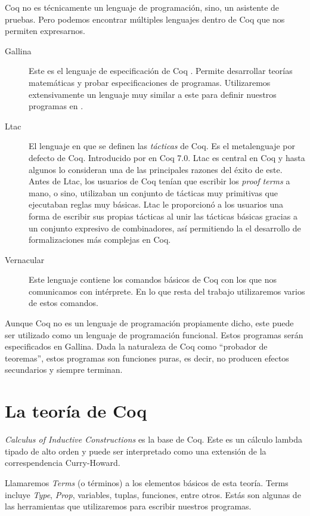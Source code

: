Coq no es técnicamente un lenguaje de programación, sino, un asistente de pruebas. Pero podemos encontrar múltiples lenguajes dentro de Coq que nos permiten expresarnos. 
\begin{description}
    \item[Gallina] Este es el lenguaje de especificación de Coq \cite{Gallina}. Permite desarrollar teorías matemáticas y probar especificaciones de programas. Utilizaremos extensivamente un lenguaje muy similar a este para definir nuestros programas en \Mtac.
    \item[Ltac] El lenguaje en que se definen las \textit{tácticas} de Coq. Es el metalenguaje por defecto de Coq. Introducido por \citeauthor{DBLP:conf/lpar/Delahaye00} en Coq 7.0. Ltac \cite{DBLP:conf/lpar/Delahaye00} es central en Coq y hasta algunos lo consideran una de las principales razones del éxito de este. Antes de Ltac, los usuarios de Coq tenían que escribir los \textit{proof terms} a mano, o sino, utilizaban un conjunto de tácticas muy primitivas que ejecutaban reglas muy básicas. Ltac le proporcionó a los usuarios una forma de escribir sus propias tácticas al unir las tácticas básicas gracias a un conjunto expresivo de combinadores, así permitiendo la el desarrollo de formalizaciones más complejas en Coq.
    \item[Vernacular] Este lenguaje contiene los comandos básicos de Coq con los que nos comunicamos con intérprete. En lo que resta del trabajo utilizaremos varios de estos comandos.
\end{description}

Aunque Coq no es un lenguaje de programación propiamente dicho, este puede ser utilizado como un lenguaje de programación funcional. Estos programas serán especificados en Gallina. Dada la naturaleza de Coq como ``probador de teoremas'', estos programas son funciones puras, es decir, no producen efectos secundarios y siempre terminan.

\section{La teoría de Coq}

\textit{Calculus of Inductive Constructions} \cite{CIC} es la base de Coq. Este es un cálculo lambda tipado de alto orden y puede ser interpretado como una extensión de la correspendencia Curry-Howard.

Llamaremos \textit{Terms} (o términos) a los elementos básicos de esta teoría. Terms incluye \textit{Type}, \textit{Prop}, variables, tuplas, funciones, entre otros. Estás son algunas de las herramientas que utilizaremos para escribir nuestros programas.

